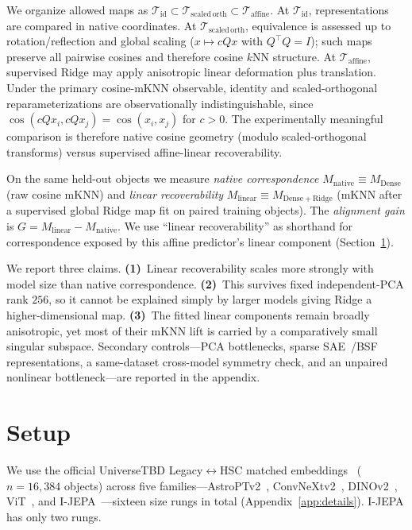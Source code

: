 \documentclass{article}
\begin{document}
We organize allowed maps as
\(\mathcal{T}_{\mathrm{id}}\subset\mathcal{T}_{\mathrm{scaled\,orth}}\subset\mathcal{T}_{\mathrm{affine}}\).
At \(\mathcal{T}_{\mathrm{id}}\), representations are compared in native coordinates.
At \(\mathcal{T}_{\mathrm{scaled\,orth}}\), equivalence is assessed up to rotation/reflection and global scaling (\(x\mapsto cQx\) with \(Q^\top Q=I\)); such maps preserve all pairwise cosines and therefore cosine \(k\)NN structure.
At \(\mathcal{T}_{\mathrm{affine}}\), supervised Ridge may apply anisotropic linear deformation plus translation.
Under the primary cosine-mKNN observable, identity and scaled-orthogonal reparameterizations are observationally indistinguishable, since \(\cos(cQx_i,cQx_j)=\cos(x_i,x_j)\) for \(c>0\).
The experimentally meaningful comparison is therefore native cosine geometry (modulo scaled-orthogonal transforms) versus supervised affine-linear recoverability.

On the same held-out objects we measure \emph{native correspondence}
\(M_{\mathrm{native}}\equiv M_{\mathrm{Dense}}\) (raw cosine mKNN) and \emph{linear recoverability}
\(M_{\mathrm{linear}}\equiv M_{\mathrm{Dense+Ridge}}\) (mKNN after a supervised global Ridge map fit on paired training objects).
The \emph{alignment gain} is \(G=M_{\mathrm{linear}}-M_{\mathrm{native}}\).
We use ``linear recoverability'' as shorthand for correspondence exposed by this affine predictor's linear component (Section~\ref{sec:setup}).

We report three claims.
\textbf{(1)}~Linear recoverability scales more strongly with model size than native correspondence.
\textbf{(2)}~This survives fixed independent-PCA rank \(256\), so it cannot be explained simply by larger models giving Ridge a higher-dimensional map.
\textbf{(3)}~The fitted linear components remain broadly anisotropic, yet most of their mKNN lift is carried by a comparatively small singular subspace.
Secondary controls---PCA bottlenecks, sparse SAE~\citep{gao2025sae}/BSF~\citep{fel2026bsf} representations, a same-dataset cross-model symmetry check, and an unpaired nonlinear bottleneck---are reported in the appendix.

\section{Setup}\label{sec:setup}

We use the official UniverseTBD Legacy\(\leftrightarrow\)HSC matched embeddings~\citep{duraphe2025platonicuniverse} (\(n{=}16{,}384\) objects) across five families---AstroPTv2~\citep{smith2024astropt}, ConvNeXtv2~\citep{woo2023convnextv2}, DINOv2~\citep{oquab2024dinov2}, ViT~\citep{dosovitskiy2021vit}, and I-JEPA~\citep{assran2023ijepa}---sixteen size rungs in total (Appendix~\ref{app:details}).
I-JEPA has only two rungs.
\end{document}
